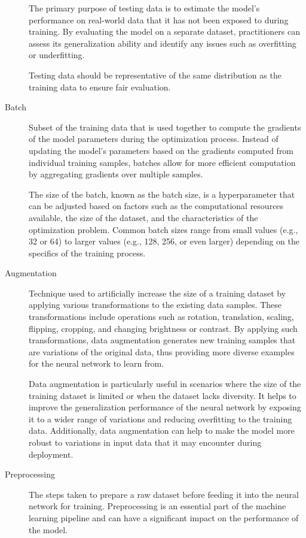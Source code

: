 \documentclass[a4paper]{report}
\begin{document}
\begin{description}
The primary purpose of testing data is to estimate the model's performance on real-world data that it has not been exposed to during training. By evaluating the model on a separate dataset, practitioners can assess its generalization ability and identify any issues such as overfitting or underfitting.

Testing data should be representative of the same distribution as the training data to ensure fair evaluation. 

\item[Batch]
Subset of the training data that is used together to compute the gradients of the model parameters during the optimization process. Instead of updating the model's parameters based on the gradients computed from individual training samples, batches allow for more efficient computation by aggregating gradients over multiple samples.

The size of the batch, known as the batch size, is a hyperparameter that can be adjusted based on factors such as the computational resources available, the size of the dataset, and the characteristics of the optimization problem. Common batch sizes range from small values (e.g., 32 or 64) to larger values (e.g., 128, 256, or even larger) depending on the specifics of the training process.

\item[Augmentation]
Technique used to artificially increase the size of a training dataset by applying various transformations to the existing data samples. These transformations include operations such as rotation, translation, scaling, flipping, cropping, and changing brightness or contrast. By applying such transformations, data augmentation generates new training samples that are variations of the original data, thus providing more diverse examples for the neural network to learn from.

Data augmentation is particularly useful in scenarios where the size of the training dataset is limited or when the dataset lacks diversity. It helps to improve the generalization performance of the neural network by exposing it to a wider range of variations and reducing overfitting to the training data. Additionally, data augmentation can help to make the model more robust to variations in input data that it may encounter during deployment.

\item[Preprocessing]
The steps taken to prepare a raw dataset before feeding it into the neural network for training. Preprocessing is an essential part of the machine learning pipeline and can have a significant impact on the performance of the model. 


\end{description}
\end{document}

